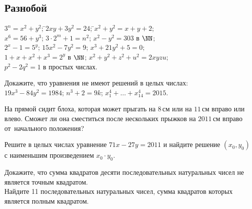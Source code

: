\endgroup%

\subsection*{Разнобой}

\begin{problems}

\item\begin{tabbing}
\sbp $3^n = x^2 + y^2$;
\qquad\=
\sbp $2 x y + 3 y^2 = 24$;
\qquad\=
\sbp $x^2 + y^2 = x + y + 2$;
\\
%
\sbp $x^6 = 56 + y^3$;
\>
\sbp $3 \cdot 2^m + 1 = n^2$;
\>
\sbp $x^2 - y^2 = 303$\; в $\NN$;
\\
%
\sbp $2^x - 1 = 5^y$;
\>
\sbp $15 x^2 - 7 y^2 = 9$;
\>
\sbp $x^3 + 21 y^2 + 5 = 0$;
\\
%
\sbp $1 + x + x^2 + x^3 = 2^y$\; в $\NN$;
\qquad
\sbp $x^2 + y^2 + z^2 + u^2 = 2 x y z u$;
\\
\sbp $p^2 - 2 q^2 = 1$\; в простых числах.
\end{tabbing}

\item
Докажите, что уравнения не имеют решений в целых числах:
\\
\sbp $19 x^3 - 84 y^2 = 1984$;
\qquad
\sbp $n^3 + 2 = 9 k$;
\qquad
\sbp $x_1^4 + \ldots + x_{14}^4 = 2015$.

\item
На прямой сидит блоха, которая может прыгать на $8\,\text{см}$ или на
$11\,\text{см}$ вправо или влево.
Сможет ли она сместиться после нескольких прыжков на $2011\,\text{см}$ вправо
от~начального положения?

\item
Решите в целых числах уравнение $71 x - 27 y = 2011$ и найдите решение
$(x_0, y_0)$ с наименьшим произведением $x_0 \cdot y_0$.

\item
\sbp
Докажите, что сумма квадратов десяти последовательных натуральных чисел не
является точным квадратом.
\\
\sbp
Найдите 11 последовательных натуральных чисел, сумма квадратов которых является
полным квадратом.

\end{problems}

